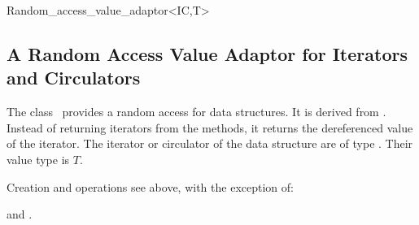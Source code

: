 \begin{ccClassTemplate}{Random_access_value_adaptor<IC,T>}
\subsection{A Random Access Value Adaptor for Iterators and Circulators}

\ccDefinition

The class \ccClassTemplateName\ provides a random access for data
structures. It is derived from
. Instead of returning
iterators from the  methods, it returns the
dereferenced value of the iterator.  The iterator or circulator of the
data structure are of type . Their value type is $T$.


\ccOperations

Creation and operations see 
above, with the exception of:




\ccSeeAlso

 and .

\end{ccClassTemplate}


\ccParDims



